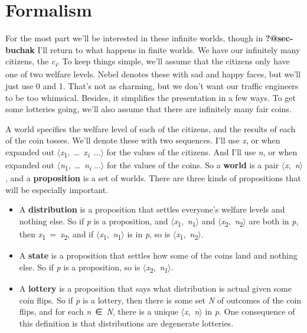 \documentclass[
  11pt,
  letterpaper,
  DIV=11,
  numbers=noendperiod,
  twoside]{scrartcl}
\providecommand{\tightlist}{%
  \setlength{\itemsep}{0pt}\setlength{\parskip}{0pt}}
\begin{document}
\section{Formalism}\label{sec-formalism}

For the most part we'll be interested in these infinite worlds, though
in \textbf{?@sec-buchak} I'll return to what happens in finite worlds.
We have our infinitely many citizens, the \emph{c\textsubscript{i}}. To
keep things simple, we'll assume that the citizens only have one of two
welfare levels. Nebel denotes these with sad and happy faces, but we'll
just use 0 and 1. That's not as charming, but we don't want our traffic
engineers to be too whimsical. Besides, it simplifies the presentation
in a few ways. To get some lotteries going, we'll also assume that there
are infinitely many fair coins.

A world specifies the welfare level of each of the citizens, and the
results of each of the coin tosses. We'll denote these with two
sequences. I'll use \emph{x}, or when expanded out
\(\langle\)\emph{x}\textsubscript{1},~\ldots~\emph{x\textsubscript{i}}~\(\ldots \rangle\)
for the values of the citizens. And I'll use \emph{n}, or when expanded
out
\(\langle\)\emph{n}\textsubscript{1},~\ldots~\emph{n\textsubscript{i}}
\(\ldots \rangle\) for the values of the coins. So a \textbf{world} is a
pair \(\langle\)\emph{x},~\emph{n}\(\rangle\), and a
\textbf{proposition} is a set of worlds. There are three kinds of
propositions that will be especially important.

\begin{itemize}
\tightlist
\item
  A \textbf{distribution} is a proposition that settles everyone's
  welfare levels and nothing else. So if \emph{p} is a proposition, and
  \(\langle\)\emph{x}\textsubscript{1},~\emph{n}\textsubscript{1}\(\rangle\)
  and
  \(\langle\)\emph{x}\textsubscript{2},~\emph{n}\textsubscript{2}\(\rangle\)
  are both in \emph{p}, then
  \emph{x}\textsubscript{1}~=~\emph{x}\textsubscript{2}, and if
  \(\langle\)\emph{x}\textsubscript{1},~\emph{n}\textsubscript{1}\(\rangle\)
  is in \emph{p}, so is
  \(\langle\)\emph{x}\textsubscript{1},~\emph{n}\textsubscript{2}\(\rangle\).
\item
  A \textbf{state} is a proposition that settles how some of the coins
  land and nothing else. So if \emph{p} is a proposition, so is
  \(\langle\)\emph{x}\textsubscript{2},~\emph{n}\textsubscript{1}\(\rangle\).
\item
  A \textbf{lottery} is a proposition that says what distribution is
  actual given some coin flips. So if \emph{p} is a lottery, then there
  is some set \emph{N} of outcomes of the coin flips, and for each
  \emph{n}~∈~\emph{N}, there is a unique
  \(\langle\)\emph{x},~\emph{n}\(\rangle\) in \emph{p}. One consequence
  of this definition is that distributions are degenerate lotteries.
\end{itemize}
\end{document}

